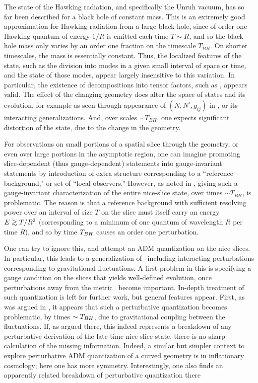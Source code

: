 
The  state of the Hawking radiation, and specifically the Unruh vacuum, has so far been described for a black hole of constant mass.  This is an extremely good approximation for Hawking radiation from a large black hole, since of order one Hawking quantum of energy $1/R$ is emitted each time $T\sim R$, and so the black hole mass only varies by an order one fraction on the timescale $T_{BH}$.
On shorter timescales, the mass is essentially constant.  Thus, the localized features of the state, such as the division into modes in a given small interval of space or time, and the state of those modes, appear largely insensitive to this variation.  In particular, the existence of decompositions into tensor factors, such as \hprod, appears valid.  The effect of the changing geometry does alter the space of states and its evolution, for example as seen through appearance of $(N,N^i,g_{ij})$ in \unitop, or its interacting generalizations.  
And, over scales $\sim T_{BH}$, one expects significant distortion of the state, due to the change in the geometry.

For observations on small portions of a spatial slice through the geometry, or even over large portions in the asymptotic region, one can imagine promoting slice-dependent (thus gauge-dependent) statements into gauge-invariant statements by introduction of extra structure corresponding to a ``reference background,"  or  set of ``local observers."  However, as noted in \QBHB, giving such a gauge-invariant characterization of the entire nice-slice state, over times $\sim T_{BH}$, is problematic.  The reason is that a reference background with sufficient resolving power over an interval of size $T$ on the slice must itself carry an energy $E\roughly> T/R^2$ (corresponding to a minimum of one quantum of wavelength $R$ per time $R$), and so by time ${T_{BH}}$ causes an order one perturbation.  

One can try to ignore this, and attempt an ADM quantization on the nice slices.  In particular, this leads to a generalization of \unitop\ including interacting perturbations corresponding to gravitational fluctuations\QBHB. A first problem in this is specifying a gauge condition on the slices that yields well-defined evolution, once perturbations away from the metric \schmet\ become important.  In-depth treatment of such quantization is left for further work, but general features appear.  First, as was argued in \QBHB, it appears that such a perturbative quantization becomes problematic, by times $\sim{T_{BH}}$, due to gravitational coupling between the fluctuations.  If, as argued there, this indeed represents a breakdown of any perturbative derivation of the late-time nice slice state, there is no sharp calculation of the missing information.  Indeed, a similar but simpler context to explore perturbative ADM quantization of a curved geometry is in inflationary cosmology; here one has more symmetry.  Interestingly, one also finds an apparently related breakdown of perturbative quantization there

